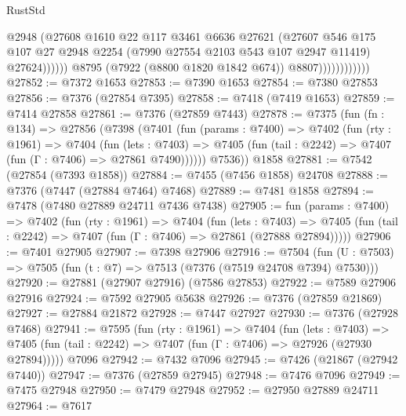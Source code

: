 \begin{lexlean}{RustStd}
\begin{coremodule}
                                    @2948
                                    (@27608
                                      @1610
                                      @22
                                      @117
                                      @3461
                                      @6636
                                      @27621
                                      (@27607
                                        @546
                                        @175
                                        @107
                                        @27
                                        @2948
                                        @2254
                                        (@7990 @27554 @2103 @543 @107 @2947 @11419)
                                        @27624))))))
                            @8795
                            (@7922 (@8800 @1820 @1842 @674))
                            @8807))))))))))))
@27852 := @7372 @1653
@27853 := @7390 @1653
@27854 := @7380 @27853
@27856 := @7376 (@27854 @7395)
@27858 := @7418 (@7419 @1653)
@27859 := @7414 @27858
@27861 := @7376 (@27859 @7443)
@27878 := @7375
    (fun (fn : @134) =>
    @27856
      (@7398
        (@7401
          (fun (params : @7400) =>
          @7402
            (fun (rty : @1961) =>
            @7404
              (fun (lets : @7403) =>
              @7405 (fun (tail : @2242) => @7407 (fun (Γ : @7406) => @27861 @7490))))))
        @7536))
    @1858
@27881 := @7542 (@27854 (@7393 @1858))
@27884 := @7455 (@7456 @1858) @24708
@27888 := @7376 (@7447 (@27884 @7464) @7468)
@27889 := @7481 @1858
@27894 := @7478 (@7480 @27889 @24711 @7436 @7438)
@27905 := fun (params : @7400) =>
  @7402
    (fun (rty : @1961) =>
    @7404
      (fun (lets : @7403) =>
      @7405 (fun (tail : @2242) => @7407 (fun (Γ : @7406) => @27861 (@27888 @27894)))))
@27906 := @7401 @27905
@27907 := @7398 @27906
@27916 := @7504
    (fun (U : @7503) => @7505 (fun (t : @7) => @7513 (@7376 (@7519 @24708 @7394) @7530)))
@27920 := @27881 (@27907 @27916) (@7586 @27853)
@27922 := @7589 @27906 @27916
@27924 := @7592 @27905 @5638
@27926 := @7376 (@27859 @21869)
@27927 := @27884 @21872
@27928 := @7447 @27927
@27930 := @7376 (@27928 @7468)
@27941 := @7595
    (fun (rty : @1961) =>
    @7404
      (fun (lets : @7403) =>
      @7405 (fun (tail : @2242) => @7407 (fun (Γ : @7406) => @27926 (@27930 @27894)))))
    @7096
@27942 := @7432 @7096
@27945 := @7426 (@21867 (@27942 @7440))
@27947 := @7376 (@27859 @27945)
@27948 := @7476 @7096
@27949 := @7475 @27948
@27950 := @7479 @27948
@27952 := @27950 @27889 @24711
@27964 := @7617

\end{coremodule}
\end{lexlean}
